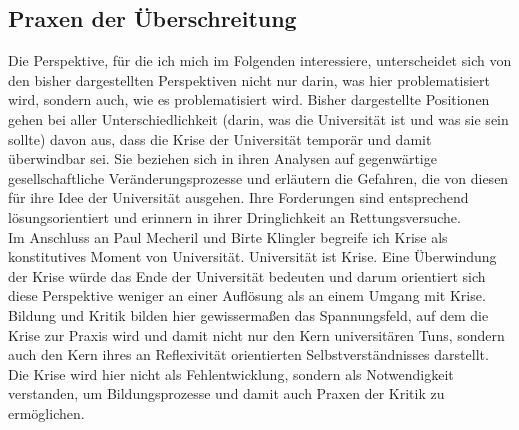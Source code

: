 \subsection{Praxen der Überschreitung}

Die Perspektive, für die ich mich im Folgenden interessiere, unterscheidet sich
von den bisher dargestellten Perspektiven nicht nur darin, was hier
problematisiert wird, sondern auch, wie es problematisiert wird. Bisher
dargestellte Positionen gehen bei aller Unterschiedlichkeit (darin, was die
Universität ist und was sie sein sollte) davon aus, dass die Krise der
Universität temporär und damit überwindbar sei. Sie beziehen sich in ihren
Analysen auf gegenwärtige gesellschaftliche Veränderungsprozesse und erläutern
die Gefahren, die von diesen für ihre Idee der Universität ausgehen. Ihre
Forderungen sind entsprechend lösungsorientiert und erinnern in ihrer
Dringlichkeit an Rettungsversuche.\\
Im Anschluss an Paul Mecheril und Birte Klingler begreife ich Krise als konstitutives Moment von
Universität. Universität ist Krise. Eine Überwindung der Krise würde das Ende
der Universität bedeuten und darum orientiert sich diese Perspektive weniger an
einer Auflösung als an einem Umgang mit Krise. Bildung und Kritik bilden hier
gewissermaßen das Spannungsfeld, auf dem die Krise zur Praxis wird und damit
nicht nur den Kern universitären Tuns, sondern auch den Kern ihres an
Reflexivität orientierten Selbstverständnisses darstellt. Die Krise wird hier
nicht als Fehlentwicklung, sondern als Notwendigkeit verstanden, um
Bildungsprozesse und damit auch Praxen der Kritik zu ermöglichen.\\

